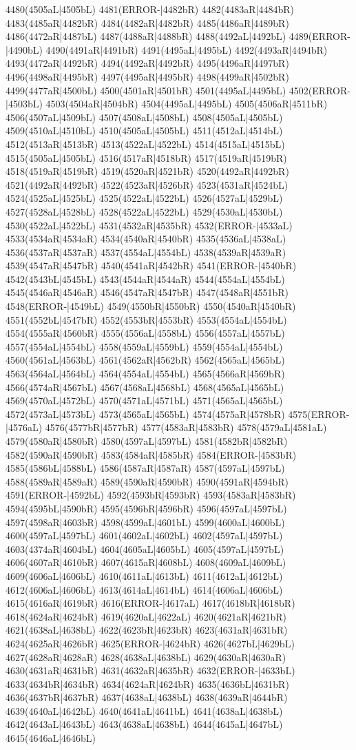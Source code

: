 4480(4505aL|4505bL) 4481(ERROR-|4482bR) 4482(4483aR|4484bR) 4483(4485aR|4482bR) 4484(4482aR|4482bR) 4485(4486aR|4489bR) 4486(4472aR|4487bL) 4487(4488aR|4488bR) 4488(4492aL|4492bL) 4489(ERROR-|4490bL) 4490(4491aR|4491bR) 4491(4495aL|4495bL) 4492(4493aR|4494bR) 4493(4472aR|4492bR) 4494(4492aR|4492bR) 4495(4496aR|4497bR) 4496(4498aR|4495bR) 4497(4495aR|4495bR) 4498(4499aR|4502bR) 4499(4477aR|4500bL) 4500(4501aR|4501bR) 4501(4495aL|4495bL) 4502(ERROR-|4503bL) 4503(4504aR|4504bR) 4504(4495aL|4495bL) 4505(4506aR|4511bR) 4506(4507aL|4509bL) 4507(4508aL|4508bL) 4508(4505aL|4505bL) 4509(4510aL|4510bL) 4510(4505aL|4505bL) 4511(4512aL|4514bL) 4512(4513aR|4513bR) 4513(4522aL|4522bL) 4514(4515aL|4515bL) 4515(4505aL|4505bL) 4516(4517aR|4518bR) 4517(4519aR|4519bR) 4518(4519aR|4519bR) 4519(4520aR|4521bR) 4520(4492aR|4492bR) 4521(4492aR|4492bR) 4522(4523aR|4526bR) 4523(4531aR|4524bL) 4524(4525aL|4525bL) 4525(4522aL|4522bL) 4526(4527aL|4529bL) 4527(4528aL|4528bL) 4528(4522aL|4522bL) 4529(4530aL|4530bL) 4530(4522aL|4522bL) 4531(4532aR|4535bR) 4532(ERROR-|4533aL) 4533(4534aR|4534aR) 4534(4540aR|4540bR) 4535(4536aL|4538aL) 4536(4537aR|4537aR) 4537(4554aL|4554bL) 4538(4539aR|4539aR) 4539(4547aR|4547bR) 4540(4541aR|4542bR) 4541(ERROR-|4540bR) 4542(4543bL|4545bL) 4543(4544aR|4544aR) 4544(4554aL|4554bL) 4545(4546aR|4546aR) 4546(4547aR|4547bR) 4547(4548aR|4551bR) 4548(ERROR-|4549bL) 4549(4550bR|4550bR) 4550(4540aR|4540bR) 4551(4552bL|4547bR) 4552(4553bR|4553bR) 4553(4554aL|4554bL) 4554(4555aR|4560bR) 4555(4556aL|4558bL) 4556(4557aL|4557bL) 4557(4554aL|4554bL) 4558(4559aL|4559bL) 4559(4554aL|4554bL) 4560(4561aL|4563bL) 4561(4562aR|4562bR) 4562(4565aL|4565bL) 4563(4564aL|4564bL) 4564(4554aL|4554bL) 4565(4566aR|4569bR) 4566(4574aR|4567bL) 4567(4568aL|4568bL) 4568(4565aL|4565bL) 4569(4570aL|4572bL) 4570(4571aL|4571bL) 4571(4565aL|4565bL) 4572(4573aL|4573bL) 4573(4565aL|4565bL) 4574(4575aR|4578bR) 4575(ERROR-|4576aL) 4576(4577bR|4577bR) 4577(4583aR|4583bR) 4578(4579aL|4581aL) 4579(4580aR|4580bR) 4580(4597aL|4597bL) 4581(4582bR|4582bR) 4582(4590aR|4590bR) 4583(4584aR|4585bR) 4584(ERROR-|4583bR) 4585(4586bL|4588bL) 4586(4587aR|4587aR) 4587(4597aL|4597bL) 4588(4589aR|4589aR) 4589(4590aR|4590bR) 4590(4591aR|4594bR) 4591(ERROR-|4592bL) 4592(4593bR|4593bR) 4593(4583aR|4583bR) 4594(4595bL|4590bR) 4595(4596bR|4596bR) 4596(4597aL|4597bL) 4597(4598aR|4603bR) 4598(4599aL|4601bL) 4599(4600aL|4600bL) 4600(4597aL|4597bL) 4601(4602aL|4602bL) 4602(4597aL|4597bL) 4603(4374aR|4604bL) 4604(4605aL|4605bL) 4605(4597aL|4597bL) 4606(4607aR|4610bR) 4607(4615aR|4608bL) 4608(4609aL|4609bL) 4609(4606aL|4606bL) 4610(4611aL|4613bL) 4611(4612aL|4612bL) 4612(4606aL|4606bL) 4613(4614aL|4614bL) 4614(4606aL|4606bL) 4615(4616aR|4619bR) 4616(ERROR-|4617aL) 4617(4618bR|4618bR) 4618(4624aR|4624bR) 4619(4620aL|4622aL) 4620(4621aR|4621bR) 4621(4638aL|4638bL) 4622(4623bR|4623bR) 4623(4631aR|4631bR) 4624(4625aR|4626bR) 4625(ERROR-|4624bR) 4626(4627bL|4629bL) 4627(4628aR|4628aR) 4628(4638aL|4638bL) 4629(4630aR|4630aR) 4630(4631aR|4631bR) 4631(4632aR|4635bR) 4632(ERROR-|4633bL) 4633(4634bR|4634bR) 4634(4624aR|4624bR) 4635(4636bL|4631bR) 4636(4637bR|4637bR) 4637(4638aL|4638bL) 4638(4639aR|4644bR) 4639(4640aL|4642bL) 4640(4641aL|4641bL) 4641(4638aL|4638bL) 4642(4643aL|4643bL) 4643(4638aL|4638bL) 4644(4645aL|4647bL) 4645(4646aL|4646bL) 